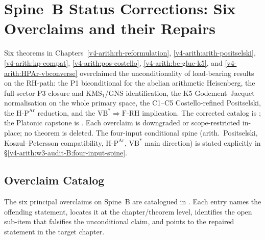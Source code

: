 \chapter{Spine~B Status Corrections: Six Overclaims and their Repairs}
\label{v4-arith:w3-audit-B}

Six theorems in Chapters~\ref{v4-arith:rh-reformulation},
\ref{v4-arith:arith-positselski}, \ref{v4-arith:kp-compat},
\ref{v4-arith:pos-costello}, \ref{v4-arith:bc-glue-k5}, and
\ref{v4-arith:HPAr-vbconverse} overclaimed the unconditionality of
load-bearing results on the RH-path: the P1 biconditional for the
abelian arithmetic Heisenberg, the full-sector P3 closure and
\(\mathrm{KMS}_1\)/GNS identification, the K5 Godement--Jacquet
normalisation on the whole primary space, the C1--C5
Costello-refined Positselski, the
\(\mathrm{H}\text{-}\mathrm{P}^{\mathrm{Ar}}\) reduction, and the
\(\mathrm{VB}^{*}\Rightarrow\mathrm{F}\text{-}\mathrm{RH}\)
implication. The corrected catalog is
; the Platonic capstone
is . Each overclaim is
downgraded or scope-restricted in-place; no theorem is deleted. The
four-input conditional spine (arith.~Positselski,
Koszul--Petersson compatibility,
\(\mathrm{H}\text{-}\mathrm{P}^{\mathrm{Ar}}\),
\(\mathrm{VB}^{*}\) main direction) is stated explicitly in
\S\ref{v4-arith:w3-audit-B:four-input-spine}.

\section{Overclaim Catalog}
\label{v4-arith:w3-audit-B:overclaim-catalog}

The six principal overclaims on Spine~B are catalogued in
. Each entry names the
offending statement, locates it at the chapter/theorem level, identifies
the open sub-item that falsifies the unconditional claim, and points to
the repaired statement in the target chapter.

